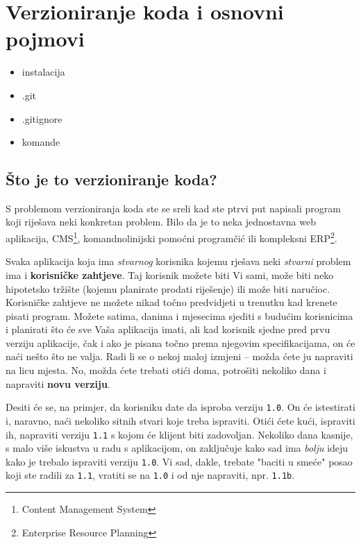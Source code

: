 \chapter*{Verzioniranje koda i osnovni pojmovi}

\begin{itemize}
   \item instalacija
   \item .git
   \item .gitignore
   \item komande
\end{itemize}

\section*{Što je to verzioniranje koda?}

S problemom verzioniranja koda ste se sreli kad ste ptrvi put napisali program koji riješava neki konkretan problem. 
Bilo da je to neka jednostavna web aplikacija, CMS\footnote{Content Management System}, komandnolinijski pomoćni programčić ili kompleksni ERP\footnote{Enterprise Resource Planning}.

Svaka aplikacija koja ima \textit{stvarnog} korisnika kojemu rješava neki \textit{stvarni} problem ima i \textbf{korisničke zahtjeve}.
Taj korisnik možete biti Vi sami, može biti neko hipotetsko tržište (kojemu planirate prodati riješenje) ili može biti naručioc.
Korisničke zahtjeve ne možete nikad točno predvidjeti u trenutku kad krenete pisati program.
Možete satima, danima i mjesecima sjediti s budućim korisnicima i planirati što će sve Vaša aplikacija imati, ali kad korisnik sjedne pred prvu verziju aplikacije, čak i ako je pisana točno prema njegovim specifikacijama, on će naći nešto što ne valja. 
Radi li se o nekoj maloj izmjeni -- možda ćete ju napraviti na licu mjesta. No, možda ćete trebati otići doma, potrošiti nekoliko dana i napraviti \textbf{novu verziju}.

Desiti će se, na primjer, da korisniku date da isproba verziju \texttt{1.0}.
On će istestirati i, naravno, naći nekoliko sitnih stvari koje treba ispraviti.
Otići ćete kući, ispraviti ih, napraviti verziju \texttt{1.1} s kojom će klijent biti zadovoljan.
Nekoliko dana kasnije, s malo više iskustva u radu s aplikacijom, on zaključuje kako sad ima \textit{bolju} ideju kako je trebalo ispraviti verziju \texttt{1.0}.
Vi sad, dakle, trebate "baciti u smeće" posao koji ste radili za \texttt{1.1}, vratiti se na \texttt{1.0} i od nje napraviti, npr. \texttt{1.1b}.


